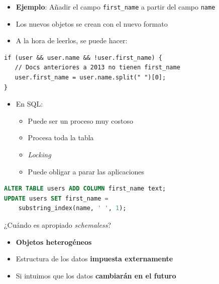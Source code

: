 \documentclass[14pt]{beamer}
\begin{document}
\begin{frame}
\framebreak

\begin{itemize}
\item {\bf Ejemplo}: Añadir el campo {\tt first\_name} a partir del campo
  {\tt name}
\item Los nuevos objetos se crean con el nuevo formato
\item A la hora de leerlos, se puede hacer:
\end{itemize}
\begin{lstlisting}
if (user && user.name && !user.first_name) {
   // Docs anteriores a 2013 no tienen first_name
   user.first_name = user.name.split(" ")[0];
}
\end{lstlisting}

\framebreak

\begin{itemize}
\item En SQL:
  \begin{itemize}
  \item Puede ser un proceso muy costoso
  \item Procesa toda la tabla
  \item {\em Locking}
  \item Puede obligar a parar las aplicaciones
  \end{itemize}
\end{itemize}
\begin{lstlisting}[language=SQL]
ALTER TABLE users ADD COLUMN first_name text;
UPDATE users SET first_name =
    substring_index(name, ' ', 1);
\end{lstlisting}

\framebreak

\begin{block}{¿Cuándo es apropiado {\em schemaless}?}
  \begin{itemize}
  \item {\bf Objetos heterogéneos}
\item Estructura de los datos {\bf impuesta externamente}
\item Si intuimos que los datos {\bf cambiarán en el futuro}
  \end{itemize}
\end{block}




\end{frame}
\end{document}
